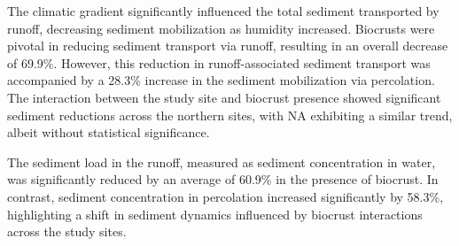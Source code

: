 The climatic gradient significantly influenced the total sediment transported by runoff, decreasing sediment mobilization as humidity increased. Biocrusts were pivotal in reducing sediment transport via runoff, resulting in an overall decrease of 69.9\%. However, this reduction in runoff-associated sediment transport was accompanied by a 28.3\% increase in the sediment mobilization via percolation. The interaction between the study site and biocrust presence showed significant sediment reductions across the northern sites, with NA exhibiting a similar trend, albeit without statistical significance.

The sediment load in the runoff, measured as sediment concentration in water, was significantly reduced by an average of 60.9\% in the presence of biocrust. In contrast, sediment concentration in percolation increased significantly by 58.3\%, highlighting a shift in sediment dynamics influenced by biocrust interactions across the study sites.

